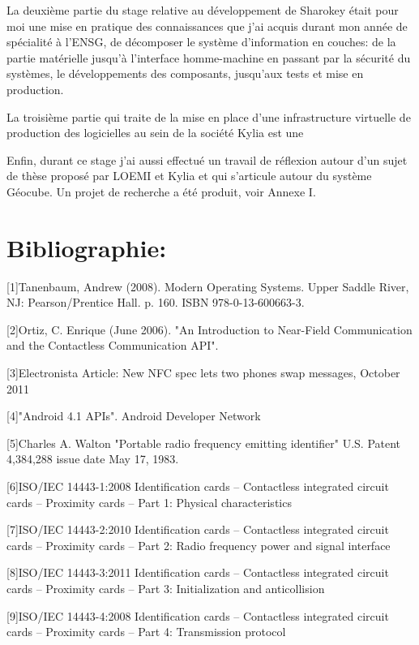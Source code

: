 \documentclass{themeensg}
\begin{document}
La deuxième partie du stage relative au développement de Sharokey était pour moi une mise en pratique des connaissances que j'ai acquis durant mon année de spécialité à l'ENSG, de décomposer le système d'information en couches: de la partie matérielle jusqu'à l'interface homme-machine en passant par la sécurité du systèmes, le développements des composants, jusqu'aux tests et mise en production.

La troisième partie qui traite de la mise en place d'une infrastructure virtuelle de production des logicielles au sein de la société Kylia est une 

Enfin, durant ce stage j'ai aussi effectué un travail de réflexion autour d'un sujet de thèse proposé par LOEMI et Kylia et qui s'articule autour du système Géocube. Un projet de recherche a été produit, voir Annexe I.

\newevenpage
\chapter*{Bibliographie:}
  \vspace{1.5cm}

[1]Tanenbaum, Andrew (2008). Modern Operating Systems. Upper Saddle River, NJ: Pearson/Prentice Hall. p. 160. ISBN 978-0-13-600663-3.

[2]Ortiz, C. Enrique (June 2006). "An Introduction to Near-Field Communication and the Contactless Communication API".

[3]Electronista Article: New NFC spec lets two phones swap messages, October 2011

[4]"Android 4.1 APIs". Android Developer Network

[5]Charles A. Walton "Portable radio frequency emitting identifier" U.S. Patent 4,384,288 issue date May 17, 1983.

[6]ISO/IEC 14443-1:2008 Identification cards -- Contactless integrated circuit cards -- Proximity cards -- Part 1: Physical characteristics

[7]ISO/IEC 14443-2:2010 Identification cards -- Contactless integrated circuit cards -- Proximity cards -- Part 2: Radio frequency power and signal interface

[8]ISO/IEC 14443-3:2011 Identification cards -- Contactless integrated circuit cards -- Proximity cards -- Part 3: Initialization and anticollision

[9]ISO/IEC 14443-4:2008 Identification cards -- Contactless integrated circuit cards -- Proximity cards -- Part 4: Transmission protocol
\end{document}

